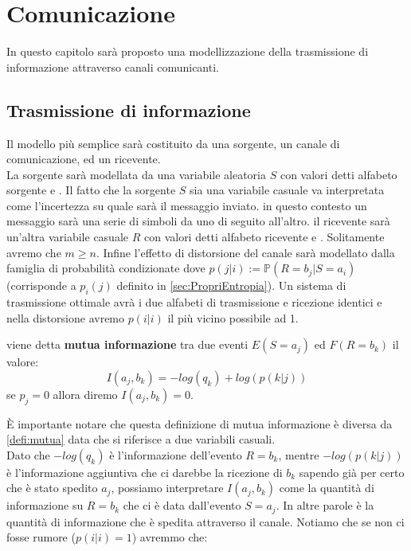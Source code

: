 \chapter{Comunicazione}

In questo capitolo sarà proposto una modellizzazione della trasmissione di informazione attraverso canali comunicanti. 

\section{Trasmissione di informazione}
\label{sec:Trasmissione}

Il modello più semplice sarà costituito da una sorgente, un canale di comunicazione, ed un ricevente.\\
La sorgente sarà modellata da una variabile aleatoria $S$ con valori \va detti alfabeto sorgente e \lep. Il fatto che la sorgente $S$ sia una variabile casuale va interpretata come l'incertezza su quale sarà il messaggio inviato. in questo contesto un messaggio sarà una serie di simboli da \va uno di seguito all'altro.
il ricevente sarà un'altra variabile casuale $R$ con valori \vb  detti alfabeto ricevente e \leggeq. Solitamente avremo che $m \geq n$. Infine l'effetto di distorsione del canale sarà modellato dalla famiglia di probabilità condizionate \lepc  dove $p(j|i):= \mathbb{P}(R=b_j|S=a_i)$ (corrisponde a $p_i(j)$ definito in \ref{sec:PropriEntropia}). Un sistema di trasmissione ottimale avrà i due alfabeti di trasmissione e ricezione identici e nella distorsione avremo $p(i|i)$ il più vicino possibile ad 1.\\
\begin{defi}
viene detta \textbf{mutua informazione}  tra due eventi $E(S=a_j)$ ed $F(R=b_k)$ il valore:
\begin{equation}
I(a_j,b_k)=-log(q_k)+ log(p(k|j))
\end{equation}
se $p_j=0$ allora diremo $I(a_j,b_k)=0$.
\end{defi}
È importante notare che questa definizione di mutua informazione è diversa da \ref{defi:mutua}  data che si riferisce a due variabili casuali.\\
Dato che $-log(q_k)$ è l'informazione dell'evento $R=b_k$, mentre $-log(p(k|j))$ è l'informazione aggiuntiva che ci darebbe la ricezione di $b_k$ sapendo già per certo che è stato spedito $a_j$, possiamo interpretare $I(a_j,b_k)$ come la quantità di informazione su $R=b_k$ che ci è data dall'evento $S=a_j$. In altre parole è la quantità di informazione che è spedita attraverso il canale. Notiamo che se non ci fosse rumore ($p(i|i)=1$) avremmo che:

